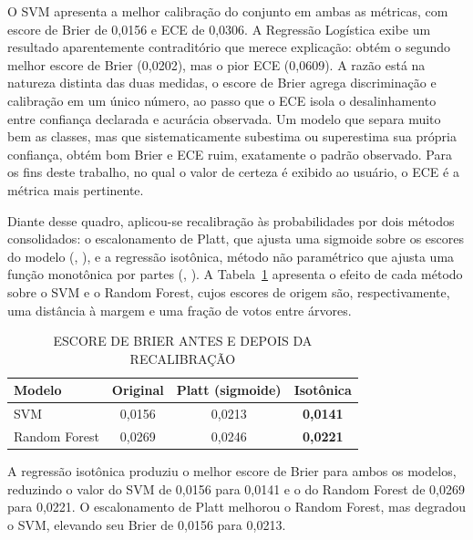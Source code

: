 \documentclass[
    12pt
    ,oneside
    ,a4paper
    ,chapter=TITLE
    ,section=TITLE
    ,sumario=abnt-6027-2012
    ,english,brazil]{abntex2} %
\begin{document}
O SVM apresenta a melhor calibração do conjunto em ambas as métricas, com escore
de Brier de 0,0156 e ECE de 0,0306. A Regressão Logística exibe um resultado
aparentemente contraditório que merece explicação: obtém o segundo melhor escore
de Brier (0,0202), mas o pior ECE (0,0609). A razão está na natureza distinta
das duas medidas, o escore de Brier agrega discriminação e calibração em um
único número, ao passo que o ECE isola o desalinhamento entre confiança
declarada e acurácia observada. Um modelo que separa muito bem as classes, mas
que sistematicamente subestima ou superestima sua própria confiança, obtém bom
Brier e ECE ruim, exatamente o padrão observado. Para os fins deste trabalho,
no qual o valor de certeza é exibido ao usuário, o ECE é a métrica mais
pertinente.

Diante desse quadro, aplicou-se recalibração às probabilidades por dois métodos
consolidados: o escalonamento de Platt, que ajusta uma sigmoide sobre os escores
do modelo (, \citeyear{Platt1999}), e a regressão
isotônica, método não paramétrico que ajusta uma função monotônica por partes
(, \citeyear{NiculescuMizil2005}). A
Tabela~\ref{tab:recalibracao} apresenta o efeito de cada método sobre o SVM e
o Random Forest, cujos escores de origem são, respectivamente, uma distância à
margem e uma fração de votos entre árvores.

\begin{table}[htbp]
    \centering
    \caption{ESCORE DE BRIER ANTES E DEPOIS DA RECALIBRAÇÃO}
    \label{tab:recalibracao}
    \begin{tabular}{@{}lccc@{}}
        \toprule
        \textbf{Modelo} & \textbf{Original} & \textbf{Platt (sigmoide)} & \textbf{Isotônica} \\
        \midrule
        SVM           & 0,0156 & 0,0213 & \textbf{0,0141} \\
        Random Forest & 0,0269 & 0,0246 & \textbf{0,0221} \\
        \bottomrule
    \end{tabular}
    \vspace{0.2cm}
    \fonteautor
\end{table}

A regressão isotônica produziu o melhor escore de Brier para ambos os modelos,
reduzindo o valor do SVM de 0,0156 para 0,0141 e o do Random Forest de 0,0269
para 0,0221. O escalonamento de Platt melhorou o Random Forest, mas degradou o
SVM, elevando seu Brier de 0,0156 para 0,0213.
\end{document}
